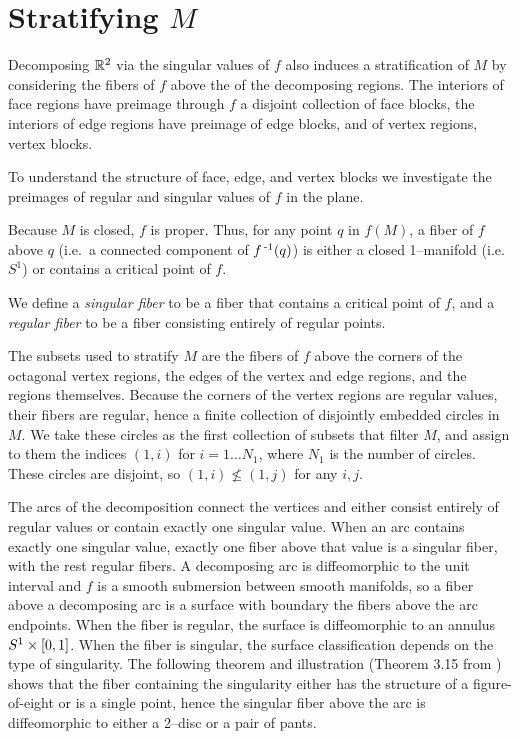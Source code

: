\section{Stratifying $M$}

Decomposing $\mathbb{R}^2$ via the singular values of $f$ also induces a stratification of $M$
by considering the fibers of $f$ above the of the decomposing regions.
The interiors of face regions have preimage through $f$ a disjoint collection of face blocks, the interiors of edge regions have preimage of edge blocks, and of vertex regions, vertex blocks.

To understand the structure of face, edge, and vertex blocks we investigate the preimages of regular and singular values of $f$ in the plane.
\begin{defn}
	Because $M$ is closed, $f$ is proper.
	Thus, for any point $q$ in $f(M)$, a fiber of $f$ above $q$ (i.e.\ a connected component of $f^{\,\text{-}1}(q)$) is either a closed 1--manifold (i.e.\ $S^1$) or contains a critical point of $f$.
	
	We define a \emph{singular fiber} to be a fiber that contains a critical point of $f$, and a \emph{regular fiber} to be a fiber consisting entirely of regular points.	
\end{defn}

The subsets used to stratify $M$ are the fibers of $f$ above the corners of the octagonal vertex regions, the edges of the vertex and edge regions, and the regions themselves.
Because the corners of the vertex regions are regular values, their fibers are regular, hence a finite collection of disjointly embedded circles in $M$.
We take these circles as the first collection of subsets that filter $M$, and assign to them the indices $(1,i)$ for $i = 1\dots N_1$, where $N_1$ is the number of circles.
These circles are disjoint, so $(1,i)\nleq (1,j)$ for any $i,j$.

The arcs of the decomposition connect the vertices and either consist entirely of regular values or contain exactly one singular value.
When an arc contains exactly one singular value, exactly one fiber above that value is a singular fiber, with the rest regular fibers.
A decomposing arc is diffeomorphic to the unit interval and $f$ is a smooth submersion between smooth manifolds, so a fiber above a decomposing arc is a surface with boundary the fibers above the arc endpoints.
When the fiber is regular, the surface is diffeomorphic to an annulus $S^1\times[0,1]$.
When the fiber is singular, the surface classification depends on the type of singularity.
The following theorem and illustration (Theorem 3.15 from \cite{Saeki}) shows that the fiber containing the singularity either has the structure of a figure-of-eight or is a single point, hence the singular fiber above the arc is diffeomorphic to either a 2--disc or a pair of pants.


